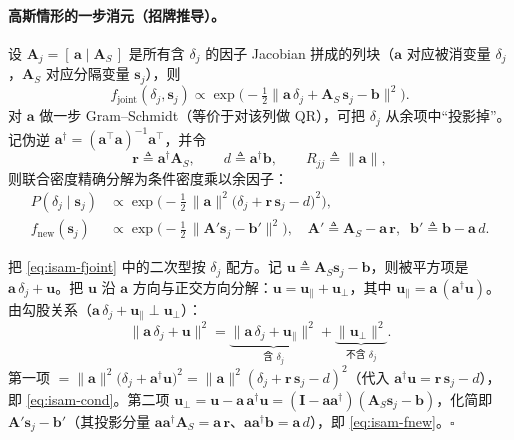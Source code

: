 \paragraph{高斯情形的一步消元（招牌推导）。}
设 $\mathbf{A}_j=[\,\mathbf{a}\mid\mathbf{A}_S\,]$ 是所有含 $\delta_j$ 的因子 Jacobian 拼成的列块（$\mathbf{a}$ 对应被消变量 $\delta_j$，$\mathbf{A}_S$ 对应分隔变量 $\mathbf{s}_j$），则\cite{kaess2012isam2}
\begin{equation}
  f_{\text{joint}}(\delta_j,\mathbf{s}_j)\propto\exp\!\Big(-\tfrac12\big\|\mathbf{a}\,\delta_j+\mathbf{A}_S\,\mathbf{s}_j-\mathbf{b}\big\|^2\Big).
  \label{eq:isam-fjoint}
\end{equation}
对 $\mathbf{a}$ 做一步 Gram--Schmidt（等价于对该列做 QR），可把 $\delta_j$ 从余项中“投影掉”。记伪逆 $\mathbf{a}^\dagger=(\mathbf{a}^\top\mathbf{a})^{-1}\mathbf{a}^\top$，并令
\begin{equation}
  \mathbf{r}\triangleq\mathbf{a}^\dagger\mathbf{A}_S,\qquad d\triangleq\mathbf{a}^\dagger\mathbf{b},\qquad R_{jj}\triangleq\|\mathbf{a}\|,
  \label{eq:isam-rd}
\end{equation}
则联合密度精确分解为条件密度乘以余因子：
\begin{align}
  P(\delta_j\mid\mathbf{s}_j)&\propto\exp\!\Big(-\tfrac12\,\|\mathbf{a}\|^2\big(\delta_j+\mathbf{r}\,\mathbf{s}_j-d\big)^2\Big),
  \label{eq:isam-cond}\\
  f_{\text{new}}(\mathbf{s}_j)&\propto\exp\!\Big(-\tfrac12\,\|\mathbf{A}'\mathbf{s}_j-\mathbf{b}'\|^2\Big),\quad
  \mathbf{A}'\triangleq\mathbf{A}_S-\mathbf{a}\,\mathbf{r},\;\; \mathbf{b}'\triangleq\mathbf{b}-\mathbf{a}\,d.
  \label{eq:isam-fnew}
\end{align}

\begin{derivation}
把 \cref{eq:isam-fjoint} 中的二次型按 $\delta_j$ 配方。记 $\mathbf{u}\triangleq\mathbf{A}_S\mathbf{s}_j-\mathbf{b}$，则被平方项是 $\mathbf{a}\,\delta_j+\mathbf{u}$。把 $\mathbf{u}$ 沿 $\mathbf{a}$ 方向与正交方向分解：$\mathbf{u}=\mathbf{u}_\parallel+\mathbf{u}_\perp$，其中 $\mathbf{u}_\parallel=\mathbf{a}\,(\mathbf{a}^\dagger\mathbf{u})$。由勾股关系（$\mathbf{a}\,\delta_j+\mathbf{u}_\parallel\perp\mathbf{u}_\perp$）：
\[
\|\mathbf{a}\,\delta_j+\mathbf{u}\|^2=\underbrace{\|\mathbf{a}\,\delta_j+\mathbf{u}_\parallel\|^2}_{\text{含 }\delta_j}+\underbrace{\|\mathbf{u}_\perp\|^2}_{\text{不含 }\delta_j}.
\]
第一项 $=\|\mathbf{a}\|^2\big(\delta_j+\mathbf{a}^\dagger\mathbf{u}\big)^2=\|\mathbf{a}\|^2(\delta_j+\mathbf{r}\,\mathbf{s}_j-d)^2$（代入 $\mathbf{a}^\dagger\mathbf{u}=\mathbf{r}\,\mathbf{s}_j-d$），即 \cref{eq:isam-cond}。第二项 $\mathbf{u}_\perp=\mathbf{u}-\mathbf{a}\,\mathbf{a}^\dagger\mathbf{u}=(\mathbf{I}-\mathbf{a}\mathbf{a}^\dagger)(\mathbf{A}_S\mathbf{s}_j-\mathbf{b})$，化简即 $\mathbf{A}'\mathbf{s}_j-\mathbf{b}'$（其投影分量 $\mathbf{a}\mathbf{a}^\dagger\mathbf{A}_S=\mathbf{a}\,\mathbf{r}$、$\mathbf{a}\mathbf{a}^\dagger\mathbf{b}=\mathbf{a}\,d$），即 \cref{eq:isam-fnew}。$\square$
\end{derivation}

